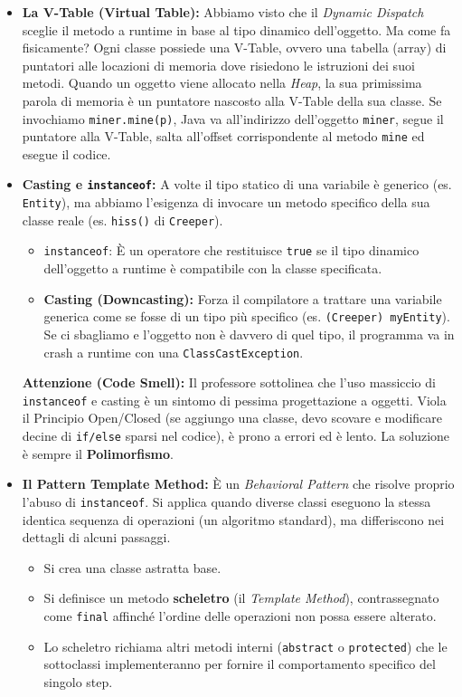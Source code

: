\documentclass[12pt, a4paper]{article}
\begin{document}
\begin{itemize}
    \item \textbf{La V-Table (Virtual Table):} Abbiamo visto che il \textit{Dynamic Dispatch} sceglie il metodo a runtime in base al tipo dinamico dell'oggetto. Ma come fa fisicamente? 
    Ogni classe possiede una V-Table, ovvero una tabella (array) di puntatori alle locazioni di memoria dove risiedono le istruzioni dei suoi metodi. 
    Quando un oggetto viene allocato nella \textit{Heap}, la sua primissima parola di memoria è un puntatore nascosto alla V-Table della sua classe. 
    Se invochiamo \texttt{miner.mine(p)}, Java va all'indirizzo dell'oggetto \texttt{miner}, segue il puntatore alla V-Table, salta all'offset corrispondente al metodo \texttt{mine} ed esegue il codice.
    
    \item \textbf{Casting e \texttt{instanceof}:} 
    A volte il tipo statico di una variabile è generico (es. \texttt{Entity}), ma abbiamo l'esigenza di invocare un metodo specifico della sua classe reale (es. \texttt{hiss()} di \texttt{Creeper}).
    \begin{itemize}
        \item \texttt{instanceof}: È un operatore che restituisce \texttt{true} se il tipo dinamico dell'oggetto a runtime è compatibile con la classe specificata.
        \item \textbf{Casting (Downcasting):} Forza il compilatore a trattare una variabile generica come se fosse di un tipo più specifico (es. \texttt{(Creeper) myEntity}). Se ci sbagliamo e l'oggetto non è davvero di quel tipo, il programma va in crash a runtime con una \texttt{ClassCastException}.
    \end{itemize}
    \textbf{Attenzione (Code Smell):} Il professore sottolinea che l'uso massiccio di \texttt{instanceof} e casting è un sintomo di pessima progettazione a oggetti. Viola il Principio Open/Closed (se aggiungo una classe, devo scovare e modificare decine di \texttt{if/else} sparsi nel codice), è prono a errori ed è lento. La soluzione è sempre il \textbf{Polimorfismo}.

    \item \textbf{Il Pattern Template Method:} È un \textit{Behavioral Pattern} che risolve proprio l'abuso di \texttt{instanceof}. Si applica quando diverse classi eseguono la stessa identica sequenza di operazioni (un algoritmo standard), ma differiscono nei dettagli di alcuni passaggi.
    \begin{itemize}
        \item Si crea una classe astratta base.
        \item Si definisce un metodo \textbf{scheletro} (il \textit{Template Method}), contrassegnato come \texttt{final} affinché l'ordine delle operazioni non possa essere alterato.
        \item Lo scheletro richiama altri metodi interni (\texttt{abstract} o \texttt{protected}) che le sottoclassi implementeranno per fornire il comportamento specifico del singolo step.
    \end{itemize}
\end{itemize}
\end{document}
